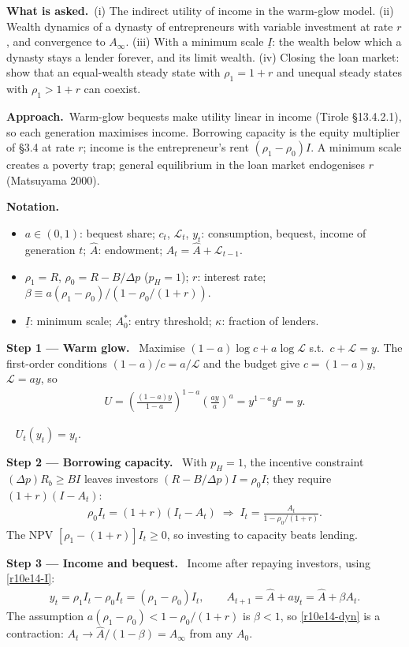 \documentclass[11pt,a4paper]{article}
\newcommand{\notation}{\par\noindent\textbf{Notation.}}
\newcommand{\step}[2]{\par\medskip\noindent\textbf{Step #1 --- #2.}~}
\newcommand{\asked}{\par\medskip\noindent\textbf{What is asked.}~}
\newcommand{\approach}{\par\smallskip\noindent\textbf{Approach.}~}
\newcommand{\answer}[1]{\par\smallskip\noindent\fbox{\textbf{Answer\if\relax\detokenize{#1}\relax\else\ #1\fi.}}~}
\begin{document}
\asked (i) The indirect utility of income in the warm-glow model. (ii) Wealth dynamics of a dynasty of entrepreneurs with variable investment at rate $r$, and convergence to $A_\infty$. (iii) With a minimum scale $\underline I$: the wealth below which a dynasty stays a lender forever, and its limit wealth. (iv) Closing the loan market: show that an equal-wealth steady state with $\rho_1=1+r$ and unequal steady states with $\rho_1>1+r$ can coexist.

\approach Warm-glow bequests make utility linear in income (Tirole \S13.4.2.1), so each generation maximises income. Borrowing capacity is the equity multiplier of \S3.4 at rate $r$; income is the entrepreneur's rent $(\rho_1-\rho_0)I$. A minimum scale creates a poverty trap; general equilibrium in the loan market endogenises $r$ (Matsuyama 2000).

\notation
\begin{itemize}
  \item $a\in(0,1)$: bequest share; $c_t$, $\mathcal L_t$, $y_t$: consumption, bequest, income of generation $t$; $\hat A$: endowment; $A_t=\hat A+\mathcal L_{t-1}$.
  \item $\rho_1=R$, $\rho_0=R-B/\Delta p$ ($p_H=1$); $r$: interest rate; $\beta\equiv a(\rho_1-\rho_0)/(1-\rho_0/(1+r))$.
  \item $\underline I$: minimum scale; $A_0^*$: entry threshold; $\kappa$: fraction of lenders.
\end{itemize}

\step{1}{Warm glow} Maximise $(1-a)\log c+a\log\mathcal L$ s.t.\ $c+\mathcal L=y$. The first-order conditions $(1-a)/c=a/\mathcal L$ and the budget give $c=(1-a)y$, $\mathcal L=ay$, so
\begin{align}
  U = \left(\frac{(1-a)y}{1-a}\right)^{1-a}\left(\frac{ay}{a}\right)^a = y^{1-a}y^a = y. \label{r10e14-U}
\end{align}

\answer{(i)} $U_t(y_t)=y_t$.

\step{2}{Borrowing capacity} With $p_H=1$, the incentive constraint $(\Delta p)R_b\geq BI$ leaves investors $(R-B/\Delta p)I=\rho_0I$; they require $(1+r)(I-A_t)$:
\begin{align}
  \rho_0I_t = (1+r)(I_t-A_t) \;\Longrightarrow\; I_t = \frac{A_t}{1-\rho_0/(1+r)}. \label{r10e14-I}
\end{align}
The NPV $[\rho_1-(1+r)]I_t\geq0$, so investing to capacity beats lending.

\step{3}{Income and bequest} Income after repaying investors, using \eqref{r10e14-I}:
\begin{align}
  y_t = \rho_1I_t-\rho_0I_t = (\rho_1-\rho_0)I_t, \qquad A_{t+1} = \hat A+ay_t = \hat A+\beta A_t. \label{r10e14-dyn}
\end{align}
The assumption $a(\rho_1-\rho_0)<1-\rho_0/(1+r)$ is $\beta<1$, so \eqref{r10e14-dyn} is a contraction: $A_t\to\hat A/(1-\beta)=A_\infty$ from any $A_0$.
\end{document}
